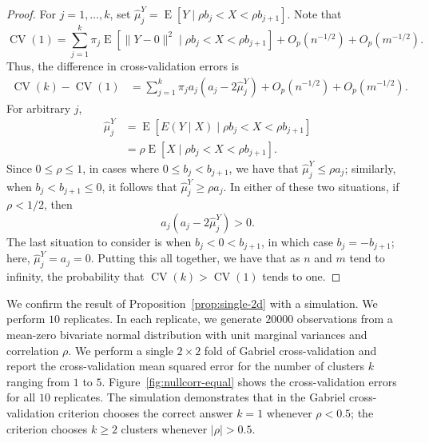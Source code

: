 \documentclass[12pt]{article}
\newcommand{\CV}{\operatorname{CV}}
\newcommand{\E}{\operatorname{E}}
\newcommand{\OhP}{O_p}
\newcommand{\hmuY}{\hat \mu^{Y}}
\begin{document}
\begin{proof}
For $j = 1, \dotsc, k$,
set
\(
  \hmuY_j =
  \E[ Y  \mid \rho b_j < X < \rho b_{j+1}].
\)
Note that
\[
  \CV(1)
    = 
  \sum_{j=1}^{k}
    \pi_j
    \E[ \|Y - 0\|^2 \mid \rho b_j < X < \rho b_{j+1}]
  + \OhP(n^{-1/2})
  + \OhP(m^{-1/2}).
\]
Thus, the difference in cross-validation errors is
\begin{align*}
\CV(k) - \CV(1)
  &=
  \sum_{j=1}^{k}
    \pi_j
    a_j
    (a_j - 2 \hmuY_j)
  + \OhP(n^{-1/2})
  + \OhP(m^{-1/2}).
\end{align*}
For arbitrary $j$,
\begin{align*}
  \hmuY_j &=
  \E[ E(Y\mid X)  \mid \rho b_j < X < \rho b_{j+1}]
\\
  &= \rho \E[ X  \mid \rho b_j < X < \rho b_{j+1}].
\end{align*}
Since $0 \leq \rho \leq 1$,
in cases where $0 \leq b_j < b_{j+1}$, we have that
$\hmuY_j \leq \rho a_j$; similarly, when $b_j < b_{j+1} \leq 0$, it follows
that $\hmuY_j \geq \rho a_j$. In either of these two situations, if $\rho <
1/2$, then
\[
  a_j (a_j - 2 \hmuY_j) > 0.
\]
The last situation to consider is when $b_j < 0 < b_{j+1}$, in which case
$b_j = - b_{j+1}$; here, $\hmuY_j = a_j = 0$.
Putting this all together, we have that as $n$ and $m$ tend to infinity,
the probability that
\(
  \CV(k) > \CV(1)
\)
tends to one.
\end{proof}


We confirm the result of Proposition~\ref{prop:single-2d} with a simulation.
We perform $10$ replicates.  In each replicate, we generate $20000$
observations from a mean-zero bivariate normal distribution with unit marginal
variances and correlation $\rho$.  We perform a single $2 \times 2$ fold of
Gabriel cross-validation and report the cross-validation mean squared error
for the number of clusters $k$ ranging from $1$ to $5$.
Figure~\ref{fig:nullcorr-equal} shows the cross-validation errors for all $10$
replicates.  The simulation demonstrates that in the Gabriel cross-validation
criterion chooses the correct answer $k = 1$ whenever $\rho < 0.5$; the
criterion chooses $k \geq 2$ clusters whenever $|\rho| > 0.5$.
\end{document}
